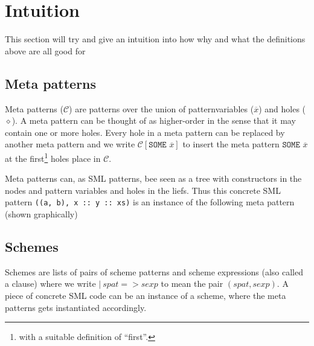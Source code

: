 \section{Intuition}

This section will try and give an intuition into how why and what the
definitions above are all good for 


\subsection{Meta patterns}
Meta patterns ($\mathcal{C}$) are patterns over the union of patternvariables
($\overline{x}$) and holes ($\diamond$). A meta pattern can be thought of as
higher-order in the sense that it may contain one or more holes. Every hole in a
meta pattern can be replaced by another meta pattern and we write
$\mathcal{C}[\texttt{SOME } \overline{x}]$ to insert the meta pattern
$\texttt{SOME } \overline{x}$ at the first\footnote{with a suitable definition
  of ``first''.} holes place in $\mathcal{C}$.

Meta patterns can, as SML patterns, bee seen as a tree with constructors in the
nodes and pattern variables and holes in the liefs. Thus this concrete SML
pattern \texttt{((a,\ b),\ x\ ::\ y\ ::\ xs)} is an instance of the following
meta pattern (shown graphically)




\subsection{Schemes}



Schemes are lists of pairs of scheme patterns and scheme expressions (also
called a clause) where we write $|\ spat => sexp$ to mean the pair $(spat,
sexp)$. A piece of concrete SML code can be an instance of a scheme, where the meta
patterns gets instantiated accordingly. 

